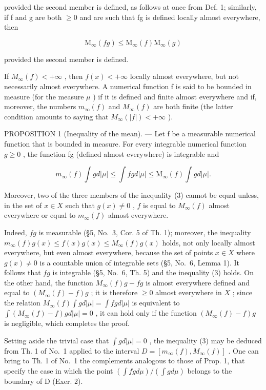 provided the second member is defined, as follows at once from Def. 1; similarly, if f and g are both \(\geqslant0\) and are such that fg is defined locally almost everywhere, then

\[
\mathrm{M} _ {\infty} (f g) \leqslant \mathrm{M} _ {\infty} (f) \mathrm{M} _ {\infty} (g)\tag{2}
\]

provided the second member is defined.

If \(M_{\infty}(f) < +\infty\) , then \(f(x) < +\infty\) locally almost everywhere, but not necessarily almost everywhere. A numerical function f is said to be bounded in measure (for the measure \(\mu\) ) if it is defined and finite almost everywhere and if, moreover, the numbers \(m_{\infty}(f)\) and \(M_{\infty}(f)\) are both finite (the latter condition amounts to saying that \(M_{\infty}(|f|)<+\infty\) ).

PROPOSITION 1 (Inequality of the mean). --- Let f be a measurable numerical function that is bounded in measure. For every integrable numerical function \(g \geqslant 0\) , the function fg (defined almost everywhere) is integrable and

\[
m _ {\infty} (f) \int g d | \mu | \leqslant \int f g d | \mu | \leqslant \mathrm{M} _ {\infty} (f) \int g d | \mu |.\tag{3}
\]

Moreover, two of the three members of the inequality (3) cannot be equal unless, in the set of \(x \in X\) such that \(g(x) \neq 0\) , \(f\) is equal to \(M_{\infty}(f)\) almost everywhere or equal to \(m_{\infty}(f)\) almost everywhere.

Indeed, \(fg\) is measurable (§5, No.~3, Cor. 5 of Th. 1); moreover, the inequality \(m_{\infty}(f)g(x) \leqslant f(x)g(x) \leqslant M_{\infty}(f)g(x)\) holds, not only locally almost everywhere, but even almost everywhere, because the set of points \(x \in X\) where \(g(x) \neq 0\) is a countable union of integrable sets (§5, No.~6, Lemma 1). It follows that \(fg\) is integrable (§5, No.~6, Th. 5) and the inequality (3) holds. On the other hand, the function \(M_{\infty}(f)g - fg\) is almost everywhere defined and equal to \((M_{\infty}(f) - f)g\) ; it is therefore \(\geqslant 0\) almost everywhere in \(X\) ; since the relation \(M_{\infty}(f) \int g d|\mu| = \int fg d|\mu|\) is equivalent to \(\int(M_{\infty}(f) - f)gd|\mu| = 0\) , it can hold only if the function \((M_{\infty}(f) - f)g\) is negligible, which completes the proof.

Setting aside the trivial case that \(\int g d|\mu| = 0\) , the inequality (3) may be deduced from Th. 1 of No.~1 applied to the interval \(D = [m_{\infty}(f), M_{\infty}(f)]\) . One can bring to Th. 1 of No.~1 the complements analogous to those of Prop. 1, that specify the case in which the point \((\int f g d\mu)/(\int g d\mu)\) belongs to the boundary of D (Exer. 2).

